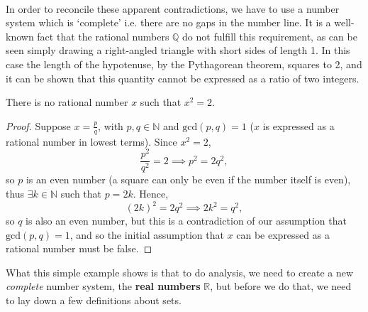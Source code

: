 \documentclass[../real_analysis.tex]{subfiles}
\begin{document}
\paragraph{}
In order to reconcile these apparent contradictions, we have to use a number system which is `complete' i.e. there are no gaps in the number line.
It is a well-known fact that the rational numbers $\mathbb{Q}$ do not fulfill this requirement, as can be seen simply drawing a right-angled triangle with short sides of length 1.
In this case the length of the hypotenuse, by the Pythagorean theorem, squares to 2, and it can be shown that this quantity cannot be expressed as a ratio of two integers.
\begin{theorem}
    There is no rational number $x$ such that $x^2=2$.
\end{theorem}
\begin{proof}
    Suppose $x=\frac{p}{q}$, with $p,q\in\mathbb{N}$ and $\mathrm{gcd}(p, q)=1$ ($x$ is expressed as a rational number in lowest terms).
    Since $x^2=2$,
    \begin{equation}
        \frac{p^2}{q^2}=2\implies p^2=2q^2,
    \end{equation}
    so $p$ is an even number (a square can only be even if the number itself is even), thus $\exists k\in\mathbb{N}$ such that $p=2k$.
    Hence,
    \begin{equation}
        (2k)^2=2q^2\implies 2k^2=q^2,
    \end{equation}
    so $q$ is also an even number, but this is a contradiction of our assumption that $\mathrm{gcd}(p,q)=1$, and so the initial assumption that $x$ can be expressed as a rational number must be false.
\end{proof}
What this simple example shows is that to do analysis, we need to create a new \textit{complete} number system, the \textbf{real numbers} $\mathbb{R}$, but before we do that, we need to lay down a few definitions about sets.
\end{document}
